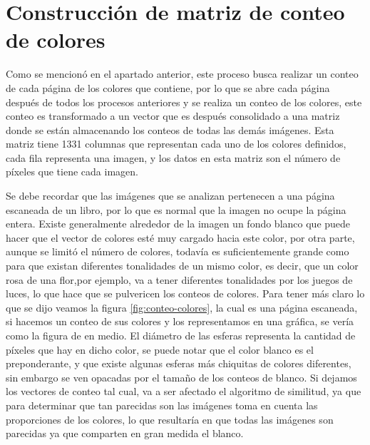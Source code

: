 \section{Construcción de matriz de conteo de colores}

Como se mencionó en el apartado anterior, este proceso busca realizar un conteo de cada página de los colores que contiene, por lo que se abre cada página después de todos los procesos anteriores y se realiza un conteo de los colores, este conteo es transformado a un vector que es después consolidado a una matriz donde se están almacenando los conteos de todas las demás imágenes. Esta matriz tiene 1331 columnas que representan cada uno de los colores definidos, cada fila representa una imagen, y los datos en esta matriz son el número de píxeles que tiene cada imagen.

Se debe recordar que las imágenes que se analizan pertenecen a una página escaneada de un libro, por lo que es normal que la imagen no ocupe la página entera. 
Existe generalmente alrededor de la imagen un fondo blanco que puede hacer que el vector de colores esté muy cargado hacia este color, por otra parte, aunque se limitó el número de colores, todavía es suficientemente grande como para que existan diferentes tonalidades de un mismo color, es decir, que un color rosa de una flor,por ejemplo, va a tener diferentes tonalidades por los juegos de luces, lo que hace que se pulvericen los conteos de colores. Para tener más claro lo que se dijo veamos la figura \ref{fig:conteo-colores}, la cual es una página escaneada, si hacemos un conteo de sus colores y los representamos en una gráfica, se vería como la figura de en medio. 
El diámetro de las esferas representa la cantidad de píxeles que hay en dicho color, se puede notar que el color blanco es el preponderante, y que existe algunas esferas más chiquitas de colores diferentes, sin embargo se ven opacadas por el tamaño de los conteos de blanco. Si dejamos los vectores de conteo tal cual, va a ser afectado el algoritmo de similitud, ya que para determinar que tan parecidas son las imágenes toma en cuenta las proporciones de los colores, lo que resultaría en que todas las imágenes son parecidas ya que comparten en gran medida el blanco.

